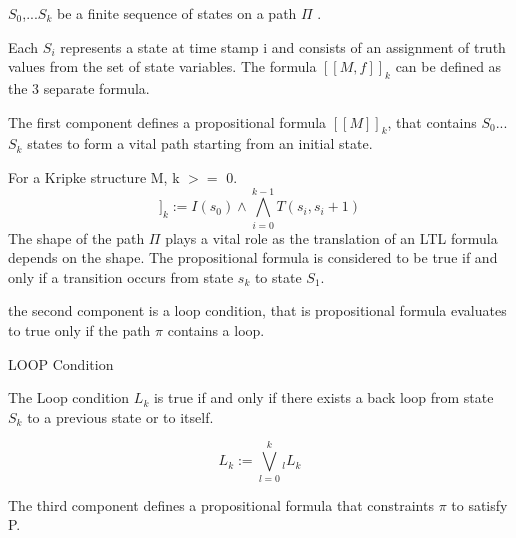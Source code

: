 $S_0$,...$S_k$ be a finite sequence of states on a path $\Pi$ .

Each $S_i$ represents a state at time stamp i and consists of an assignment of 
truth values from the set of state variables. The formula $[[M,f]]_k$ can be defined as
the 3 separate formula.

The first component defines a propositional formula $[[M]]_k$, that contains
$S_0$...$S_k$ states to form a vital path starting from an initial state.

For a Kripke structure M, k $>=$ 0.
\begin{equation}
   [[M]]_{k} := I(s_0) \wedge \bigwedge_{i=0}^{k-1} T(s_i,s_i+1)
\end{equation}   
  The shape of the path $\Pi$ plays a vital role as the translation of an LTL 
  formula depends on the shape. The propositional formula is considered to be 
  true if and only if a transition occurs from state $s_k$ to state $S_1$.
  
  the second component is a loop condition, that is propositional formula evaluates 
  to true only if the path $\pi$ contains a loop.
  
  LOOP Condition
  
  The Loop condition $L_k$ is true if and only if there exists a back loop
  from state $S_k$ to a previous state or to itself.
  
\begin{equation}
     L_k := \bigvee_{l=0}^{k} _{l}L_{k}
\end{equation}
   
           
          
  The third component defines a propositional formula that constraints $\pi$ to
  satisfy P.

